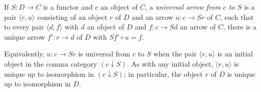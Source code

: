 If $S: D \to C$ is a functor and $c$ an object of $C$, a \emph{universal arrow from $c$ to $S$} is a pair $\langle r, u \rangle$ consisting of an object $r$ of $D$ and an arrow $u: c \to Sr$ of $C$, such that to every pair $\langle d, f \rangle$ with $d$ an object of $D$ and $f: c \to Sd$ an arrow of $C$, there is a unique arrow $f': r \to d$ of $D$ with $Sf' \circ u = f$.

Equivalently, $u: c \to Sr$ is universal from $c$ to $S$ when the pair $\langle r, u \rangle$ is an initial object in the comma category $(c \downarrow S)$. As with any initial object, $\langle r, u \rangle$ is unique up to isomorphism in $(c \downarrow S)$; in particular, the object $r$ of $D$ is unique up to isomorphism in $D$.
